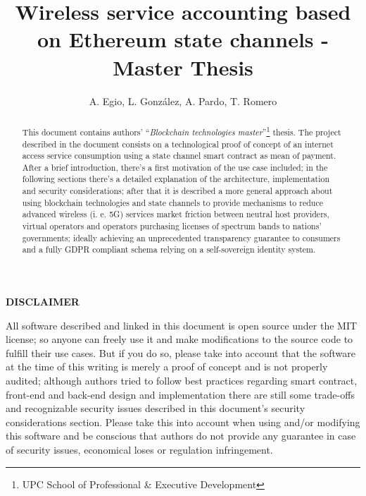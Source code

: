 \documentclass[12pt]{amsart}
\title{Wireless service accounting based on Ethereum state channels
- Master Thesis}
\author{
  A. Egio,
  L. González, A. Pardo, T. Romero
}
\begin{document}
\pagecolor{pagecolor}


\begin{abstract}
    This document contains authors' ``\textit{Blockchain
      technologies master}''\footnote{UPC School
      of Professional \& Executive Development}
    thesis. The project described in the document
    consists on a technological proof
    of concept of an internet access service consumption
    using a state channel smart contract as
    mean of payment. After a brief
    introduction, there's a first motivation of
    the use case included;
    in the following sections
    there's a detailed explanation of
    the architecture, implementation and
    security considerations;
    after that it is described a more
    general approach about using blockchain technologies
    and state channels to provide
    mechanisms to reduce advanced wireless
    (i. e. 5G) services market friction between neutral host
    providers, virtual operators and operators
    purchasing licenses of spectrum bands to nations' governments;
    ideally achieving an unprecedented transparency guarantee to consumers and
    a fully GDPR compliant
    schema relying on a self-sovereign identity system.

\end{abstract}

\maketitle

\tableofcontents

\newpage

\vspace*{5cm}

\Huge{\textbf{DISCLAIMER}}
\vspace{1cm}


\Large
All software described and linked in this document is open source
under the MIT license; so anyone can freely use it and make
modifications to the source code to fulfill their use
cases. But if you do so, please take into account that the software
at the time of this writing is merely
a proof of concept and is not properly audited; although
authors tried to follow best practices regarding smart contract,
front-end and back-end design and implementation there are still
some trade-offs and recognizable security issues
described in this document's
security considerations section. Please take this into account
when using and/or modifying this software and be conscious
that authors do not provide any guarantee in case of
security issues, economical loses or regulation infringement.
\end{document}

